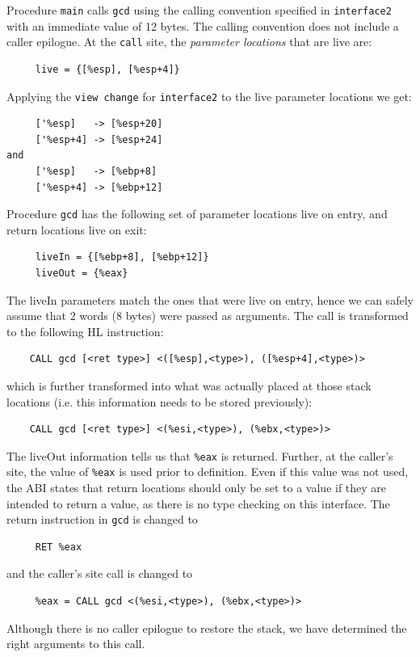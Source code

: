 Procedure \texttt{main} calls \texttt{gcd} using the calling convention 
specified in \texttt{interface2} with an immediate value of 12 bytes. 
The calling convention does not include a caller epilogue. 
At the \texttt{call} site, the \emph{parameter locations} that are live are: 
\begin{verbatim}
     live = {[%esp], [%esp+4]}
\end{verbatim}
Applying the \texttt{view change} for \texttt{interface2} to the live
parameter locations we get: 
\begin{verbatim}
     ['%esp]   -> [%esp+20]
     ['%esp+4] -> [%esp+24]
and
     ['%esp]   -> [%ebp+8]
     ['%esp+4] -> [%ebp+12]
\end{verbatim}
Procedure \texttt{gcd} has the following set of parameter locations
live on entry, and return locations live on exit: 
\begin{verbatim}
     liveIn = {[%ebp+8], [%ebp+12]}
     liveOut = {%eax}
\end{verbatim}
The liveIn parameters match the ones that were live on entry, hence 
we can safely assume that 2 words (8 bytes) were passed as arguments.
The call is transformed to the following HL instruction: 
\begin{verbatim}
    CALL gcd [<ret type>] <([%esp],<type>), ([%esp+4],<type>)>
\end{verbatim}
which is further transformed into what was actually placed at those 
stack locations (i.e. this information needs to be stored previously): 
\begin{verbatim}
    CALL gcd [<ret type>] <(%esi,<type>), (%ebx,<type>)>
\end{verbatim}
The liveOut information tells us that \texttt{\%eax} is returned. 
Further, at the caller's site, the value of \texttt{\%eax} is 
used prior to definition.  Even if this value was not used, the ABI 
states that return locations should only be set to a value if they
are intended to return a value, as there is no type checking on 
this interface.  The return instruction in \texttt{gcd} is changed to
\begin{verbatim}
     RET %eax
\end{verbatim}
and the caller's site call is changed to 
\begin{verbatim}
     %eax = CALL gcd <(%esi,<type>), (%ebx,<type>)>
\end{verbatim} 
Although there is no caller epilogue to restore the stack, we have
determined the right arguments to this call.


